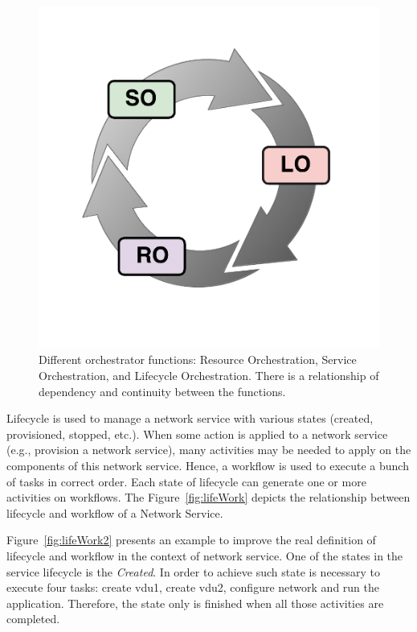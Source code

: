 \begin{figure}[t!]
  \centering
  \includegraphics[scale=.35]{Figures/03_NSO/fun_orch}
    \caption{Different orchestrator functions: Resource Orchestration, Service Orchestration, and Lifecycle Orchestration. There is a relationship of dependency and continuity between the functions.}
    \label{funOrch}
\end{figure}

Lifecycle is used to manage a network service with various states (created, provisioned, stopped, etc.). When some action is applied to a network service (e.g., provision a network service), many activities may be needed to apply on the components of this network service. Hence, a workflow is used to execute a bunch of tasks in correct order. Each state of lifecycle can generate one or more activities on workflows. The Figure~\ref{fig:lifeWork} depicts the relationship between lifecycle and workflow of a Network Service. 

Figure~\ref{fig:lifeWork2} presents an example to improve the real definition of lifecycle and workflow in the context of network service. One of the states in the service lifecycle is the \textit{Created}. In order to achieve such state is necessary to execute four tasks: create \gls{vdu}1, create \gls{vdu}2, configure network and run the application. Therefore, the state only is finished when all those activities are completed.

